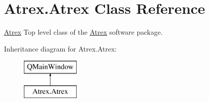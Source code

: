 \hypertarget{class_atrex_1_1_atrex}{\section{Atrex.\-Atrex Class Reference}
\label{class_atrex_1_1_atrex}
}


\hyperlink{class_atrex_1_1_atrex}{Atrex} Top level class of the \hyperlink{class_atrex_1_1_atrex}{Atrex} software package.  


Inheritance diagram for Atrex.\-Atrex\-:\begin{figure}[H]
\begin{center}
\leavevmode
\includegraphics[height=2.000000cm]{class_atrex_1_1_atrex}
\end{center}
\end{figure}
